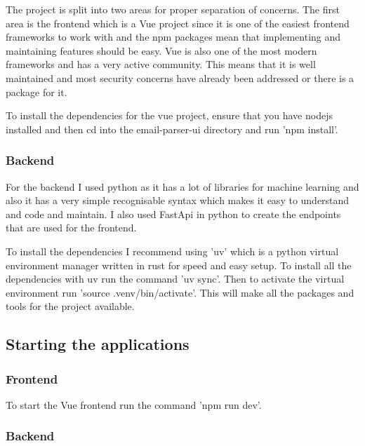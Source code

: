 \documentclass[a4paper,10pt]{article}
\begin{document}
The project is split into two areas for proper separation of concerns. The first
area is the frontend which is a Vue project since it is one of the easiest
frontend frameworks to work with and the npm packages mean that implementing and
maintaining features should be easy. Vue is also one of the most modern frameworks
and has a very active community. This means that it is well maintained and most
security concerns have already been addressed or there is a package for it.\par

To install the dependencies for the vue project, ensure that you have nodejs
installed and then cd into the email-parser-ui directory and run 'npm
install'.\par

\subsubsection{Backend}

For the backend I used python as it has a lot of libraries for machine learning
and also it has a very simple recognisable syntax which makes it easy to
understand and code and maintain. I also used FastApi in python to create the
endpoints that are used for the frontend. \par

To install the dependencies I recommend using 'uv' which is a python virtual
environment manager written in rust for speed and easy setup. To install all the
dependencies with uv run the command 'uv sync'. Then to activate the virtual
environment run 'source .venv/bin/activate'. This will make all the packages and
tools for the project available.\par

\subsection{Starting the applications}

\subsubsection{Frontend}

To start the Vue frontend run the command 'npm run dev'.

\subsubsection{Backend}
\end{document}
